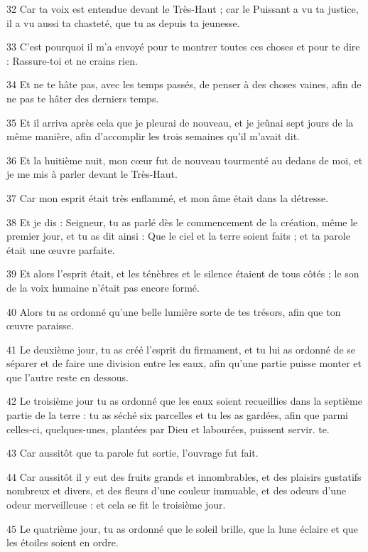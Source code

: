 \par 32 Car ta voix est entendue devant le Très-Haut ; car le Puissant a vu ta justice, il a vu aussi ta chasteté, que tu as depuis ta jeunesse.
\par 33 C'est pourquoi il m'a envoyé pour te montrer toutes ces choses et pour te dire : Rassure-toi et ne crains rien.
\par 34 Et ne te hâte pas, avec les temps passés, de penser à des choses vaines, afin de ne pas te hâter des derniers temps.
\par 35 Et il arriva après cela que je pleurai de nouveau, et je jeûnai sept jours de la même manière, afin d'accomplir les trois semaines qu'il m'avait dit.
\par 36 Et la huitième nuit, mon cœur fut de nouveau tourmenté au dedans de moi, et je me mis à parler devant le Très-Haut.
\par 37 Car mon esprit était très enflammé, et mon âme était dans la détresse.
\par 38 Et je dis : Seigneur, tu as parlé dès le commencement de la création, même le premier jour, et tu as dit ainsi : Que le ciel et la terre soient faits ; et ta parole était une œuvre parfaite.
\par 39 Et alors l'esprit était, et les ténèbres et le silence étaient de tous côtés ; le son de la voix humaine n’était pas encore formé.
\par 40 Alors tu as ordonné qu'une belle lumière sorte de tes trésors, afin que ton œuvre paraisse.
\par 41 Le deuxième jour, tu as créé l'esprit du firmament, et tu lui as ordonné de se séparer et de faire une division entre les eaux, afin qu'une partie puisse monter et que l'autre reste en dessous.
\par 42 Le troisième jour tu as ordonné que les eaux soient recueillies dans la septième partie de la terre : tu as séché six parcelles et tu les as gardées, afin que parmi celles-ci, quelques-unes, plantées par Dieu et labourées, puissent servir. te.
\par 43 Car aussitôt que ta parole fut sortie, l'ouvrage fut fait.
\par 44 Car aussitôt il y eut des fruits grands et innombrables, et des plaisirs gustatifs nombreux et divers, et des fleurs d'une couleur immuable, et des odeurs d'une odeur merveilleuse : et cela se fit le troisième jour.
\par 45 Le quatrième jour, tu as ordonné que le soleil brille, que la lune éclaire et que les étoiles soient en ordre.

